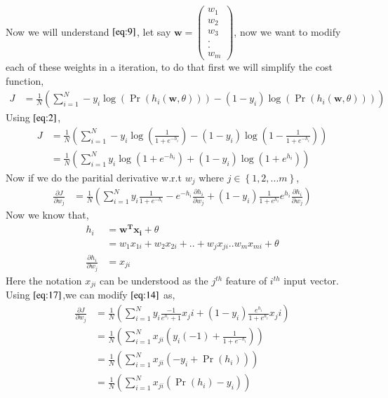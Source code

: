 \documentclass[journal,12pt,onecolumn]{IEEEtran}
\providecommand{\pr}[1]{\ensuremath{\Pr\left(#1\right)}}
\providecommand{\brak}[1]{\ensuremath{\left(#1\right)}}
\providecommand{\cbrak}[1]{\ensuremath{\left\{#1\right\}}}
\theoremstyle{remark}
\newcommand{\myvec}[1]{\ensuremath{\begin{pmatrix}#1\end{pmatrix}}}
\numberwithin{equation}{section}
\let\vec\mathbf
\begin{document}
		Now we will understand $\eqref{eq:9}$, let say $\vec{w} =\myvec{w_1\\w_2\\w_3\\.\\.\\w_m}$, now we want to modify each of these weights in a iteration, to do that
		first we will simplify the cost function,
		\begin{align}
			J &= \frac{1}{N}\brak{\sum_{i=1}^{N}-y_{i}\log\brak{\pr{h_i\brak{\vec{w},\theta}}} - \brak{1-y_i}\log\brak{\pr{h_i\brak{\vec{w},\theta}}}}
		\end{align}
		Using $\eqref{eq:2}$,
		\begin{align}
			J &= \frac{1}{N}\brak{\sum_{i=1}^{N}-y_{i}\log\brak{\frac{1}{1+e^{-h_i}}} - \brak{1-y_i}\log\brak{1-\frac{1}{1+e^{-h_i}}}}\\
			&= \frac{1}{N}\brak{\sum_{i=1}^{N}y_{i}\log\brak{1+e^{-h_i}} + \brak{1-y_i}\log\brak{1+e^{h_i}}}
		\end{align}
		Now if we do the paritial derivative w.r.t $w_j$ where $j \in \cbrak{1,2,...m}$,
		\begin{align}
			\frac{\partial J}{\partial w_j} &= \frac{1}{N}\brak{\sum_{i=1}^{N}y_{i}\frac{1}{1+e^{-h_i}}-e^{-h_i}\frac{\partial h_i}{\partial w_j} + \brak{1-y_i}\frac{1}{1+e^{h_i}}e^{h_i}\frac{\partial h_i}{\partial w_j}}\label{eq:14} 
		\end{align}
		Now we know that,
		\begin{align}
			h_i &= \vec{w^T}\vec{x_i} + \theta \\
			&= w_1x_{1i} + w_2x_{2i} + ..+w_jx_{ji}.. w_mx_{mi} + \theta\\
			\frac{\partial h_i}{\partial w_j} &= x_{ji}\label{eq:17}
		\end{align}
		Here the notation $x_{ji}$ can be understood as the $j^{th}$ feature of $i^{th}$ input vector.
		Using $\eqref{eq:17}$,we can modify $\eqref{eq:14}$ as,
		\begin{align}
			\frac{\partial J}{\partial w_j} &= \frac{1}{N}\brak{\sum_{i=1}^{N}y_i\frac{-1}{e^{h_i} + 1}x_ji + \brak{1-y_i}\frac{e^{h_i}}{1+e^{h_i}}x_ji}\\
			&= \frac{1}{N}\brak{\sum_{i=1}^{N}x_{ji}\brak{y_i\brak{-1} + \frac{1}{1 + e^{-h_i}}}}\\
			&= \frac{1}{N}\brak{\sum_{i=1}^{N}x_{ji}\brak{-y_i + \pr{h_i}}}\\
			&= \frac{1}{N}\brak{\sum_{i=1}^{N}x_{ji}\brak{\pr{h_i}-y_i}}
		\end{align}
\end{document}
